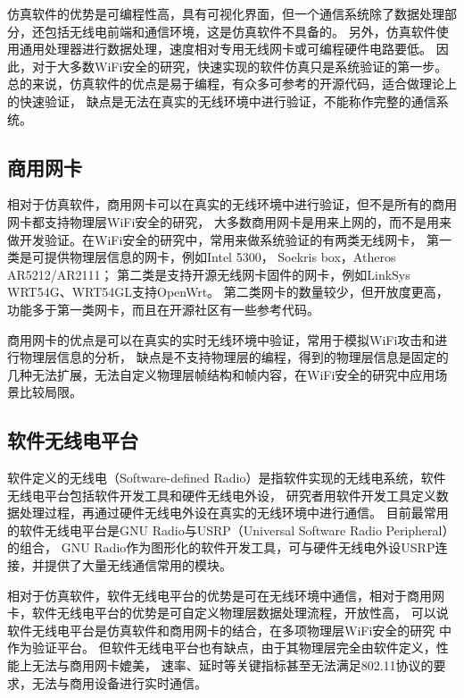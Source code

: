 		仿真软件的优势是可编程性高，具有可视化界面，但一个通信系统除了数据处理部分，还包括无线电前端和通信环境，这是仿真软件不具备的。
		另外，仿真软件使用通用处理器进行数据处理，速度相对专用无线网卡或可编程硬件电路要低。
		因此，对于大多数WiFi安全的研究，快速实现的软件仿真只是系统验证的第一步。
		总的来说，仿真软件的优点是易于编程，有众多可参考的开源代码，适合做理论上的快速验证，
		缺点是无法在真实的无线环境中进行验证，不能称作完整的通信系统。

		\subsection{商用网卡}
		相对于仿真软件，商用网卡可以在真实的无线环境中进行验证，但不是所有的商用网卡都支持物理层WiFi安全的研究，
		大多数商用网卡是用来上网的，而不是用来做开发验证。在WiFi安全的研究中，常用来做系统验证的有两类无线网卡，
		第一类是可提供物理层信息的网卡，例如Intel 5300\cite{ccs16csi, wisec14violating, acsac15iot}，
		Soekris box\cite{mobicom13securearray}，Atheros AR5212/AR2111\cite{mobicom08radiometric}；
		第二类是支持开源无线网卡固件的网卡，例如LinkSys WRT54G\cite{wisec06spoofing}、WRT54GL\cite{iet13multilayer}支持OpenWrt。
		第二类网卡的数量较少，但开放度更高，功能多于第一类网卡，而且在开源社区有一些参考代码。

		商用网卡的优点是可以在真实的实时无线环境中验证，常用于模拟WiFi攻击和进行物理层信息的分析，
		缺点是不支持物理层的编程，得到的物理层信息是固定的几种无法扩展，无法自定义物理层帧结构和帧内容，在WiFi安全的研究中应用场景比较局限。

		\subsection{软件无线电平台}
		软件定义的无线电（Software-defined Radio）是指软件实现的无线电系统，软件无线电平台包括软件开发工具和硬件无线电外设，
		研究者用软件开发工具定义数据处理过程，再通过硬件无线电外设在真实的无线环境中进行通信。
		目前最常用的软件无线电平台是GNU Radio\cite{gnuradio}与USRP（Universal Software Radio Peripheral）\cite{ettus09usrp}的组合，
		GNU Radio作为图形化的软件开发工具，可与硬件无线电外设USRP连接，并提供了大量无线通信常用的模块。

		相对于仿真软件，软件无线电平台的优势是可在无线环境中通信，相对于商用网卡，软件无线电平台的优势是可自定义物理层数据处理流程，开放性高，
		可以说软件无线电平台是仿真软件和商用网卡的结合，在多项物理层WiFi安全的研究
		\cite{ccs16mumimo, cns15injection, globecom14location, tvt16spoofing}中作为验证平台。
		但软件无线电平台也有缺点，由于其物理层完全由软件定义，性能上无法与商用网卡媲美，
		速率、延时等关键指标甚至无法满足802.11协议的要求，无法与商用设备进行实时通信。

